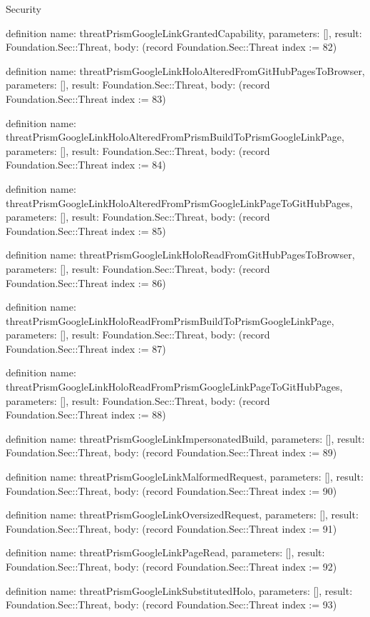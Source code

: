 \begin{lexlean}{Security}
\begin{semanticmodule}
definition{
  name: threatPrismGoogleLinkGrantedCapability,
  parameters: [],
  result: Foundation.Sec::Threat,
  body: (record Foundation.Sec::Threat {index := 82})
}

definition{
  name: threatPrismGoogleLinkHoloAlteredFromGitHubPagesToBrowser,
  parameters: [],
  result: Foundation.Sec::Threat,
  body: (record Foundation.Sec::Threat {index := 83})
}

definition{
  name: threatPrismGoogleLinkHoloAlteredFromPrismBuildToPrismGoogleLinkPage,
  parameters: [],
  result: Foundation.Sec::Threat,
  body: (record Foundation.Sec::Threat {index := 84})
}

definition{
  name: threatPrismGoogleLinkHoloAlteredFromPrismGoogleLinkPageToGitHubPages,
  parameters: [],
  result: Foundation.Sec::Threat,
  body: (record Foundation.Sec::Threat {index := 85})
}

definition{
  name: threatPrismGoogleLinkHoloReadFromGitHubPagesToBrowser,
  parameters: [],
  result: Foundation.Sec::Threat,
  body: (record Foundation.Sec::Threat {index := 86})
}

definition{
  name: threatPrismGoogleLinkHoloReadFromPrismBuildToPrismGoogleLinkPage,
  parameters: [],
  result: Foundation.Sec::Threat,
  body: (record Foundation.Sec::Threat {index := 87})
}

definition{
  name: threatPrismGoogleLinkHoloReadFromPrismGoogleLinkPageToGitHubPages,
  parameters: [],
  result: Foundation.Sec::Threat,
  body: (record Foundation.Sec::Threat {index := 88})
}

definition{
  name: threatPrismGoogleLinkImpersonatedBuild,
  parameters: [],
  result: Foundation.Sec::Threat,
  body: (record Foundation.Sec::Threat {index := 89})
}

definition{
  name: threatPrismGoogleLinkMalformedRequest,
  parameters: [],
  result: Foundation.Sec::Threat,
  body: (record Foundation.Sec::Threat {index := 90})
}

definition{
  name: threatPrismGoogleLinkOversizedRequest,
  parameters: [],
  result: Foundation.Sec::Threat,
  body: (record Foundation.Sec::Threat {index := 91})
}

definition{
  name: threatPrismGoogleLinkPageRead,
  parameters: [],
  result: Foundation.Sec::Threat,
  body: (record Foundation.Sec::Threat {index := 92})
}

definition{
  name: threatPrismGoogleLinkSubstitutedHolo,
  parameters: [],
  result: Foundation.Sec::Threat,
  body: (record Foundation.Sec::Threat {index := 93})
}


\end{semanticmodule}
\end{lexlean}

